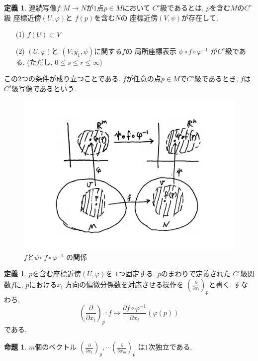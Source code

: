 \documentclass[twocolumn]{jarticle}
\theoremstyle{definition}
\newtheorem{definition}[theorem]{定義}
\newtheorem{proposition}[theorem]{命題}
\begin{document}
\begin{definition}\label{def:C^s map}
  連続写像$f:M\to N$が$1$点$p\in M$において
  $C^s$級であるとは, $p$を含む$M$の$C^r$級
  座標近傍$(U,\varphi)$と
  $f(p)$を含む$N$の
  座標近傍$(V,\psi)$が存在して, 
  \begin{itemize}
      \item[(1)]$f(U)\subset V$
      \item[(2)]$(U,\varphi)$と
      $(V;y_1,\psi)$に関する$f$の
      局所座標表示
      $\psi\circ f\circ \varphi^{-1}$
      が$C^s$級である.
      (ただし, $0\leq s \leq r \leq \infty$) 
  \end{itemize}
  この$2$つの条件が成り立つことである. 
  $f$が任意の点$p\in M$で$C^s$級であるとき, 
  $f$は$C^s$級写像であるという. 
\end{definition}
\begin{figure}[H]
  \centering
  \includegraphics[keepaspectratio, scale=0.24]
       {Csmap.pdf}
  \caption{$f$と$\psi\circ f\circ \varphi^{-1}$
  の関係}
  \label{CoSysInS2}
 \end{figure}
\begin{definition}
  $p$を含む座標近傍$(U,\varphi)$を
  $1$つ固定する. $p$のまわりで定義された
  $C^r$級関数$f$に, $p$における$x_i$
  方向の偏微分係数を対応させる操作を
  $\left(\frac{\partial}{\partial x_i}
  \right)_p$と書く. すなわち, 
  $$\left(\frac{\partial}{\partial x_i}
  \right)_p:f\mapsto 
  \frac{\partial f\circ \varphi^{-1}}{\partial x_i}(
    \varphi(p))$$
  である. 
\end{definition}
\begin{proposition} 
  $m$個のベクトル
  $\left(\frac{\partial}{\partial x_1}\right)_p, 
  \cdots 
  \left(\frac{\partial}{\partial x_m}\right)_p$
  は$1$次独立である. 
\end{proposition}
\end{document}
